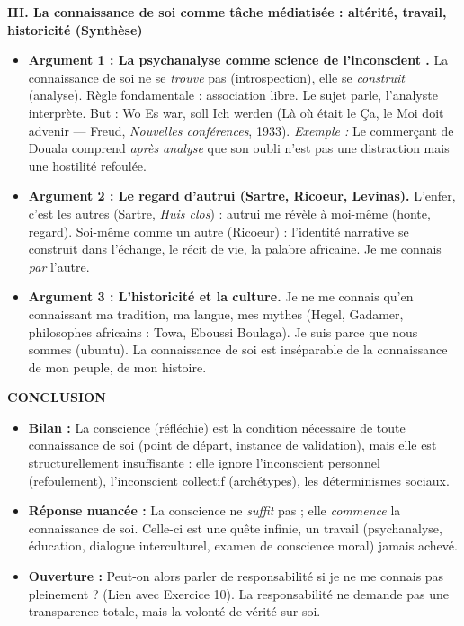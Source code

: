 \documentclass[11pt]{article}
\newcommand{\cle}[1]{{\popxbold\color{popdark}#1}}
\begin{document}
\begin{corrige}
\textbf{III. La connaissance de soi comme tâche médiatisée : altérité, travail, historicité (Synthèse)}
\begin{itemize}
\item \textbf{Argument 1 : La psychanalyse comme \guillemotleft science de l'inconscient \guillemotright.} La connaissance de soi ne se \emph{trouve} pas (introspection), elle se \emph{construit} (analyse). Règle fondamentale : \cle{association libre}. Le sujet parle, l'analyste interprète. But : \guillemotleft Wo Es war, soll Ich werden \guillemotright (Là où était le Ça, le Moi doit advenir — Freud, \emph{Nouvelles conférences}, 1933). \textit{Exemple :} Le commerçant de Douala comprend \emph{après analyse} que son oubli n'est pas une distraction mais une hostilité refoulée.
\item \textbf{Argument 2 : Le regard d'autrui (Sartre, Ricoeur, Levinas).} \guillemotleft L'enfer, c'est les autres \guillemotright (Sartre, \emph{Huis clos}) : autrui me révèle à moi-même (honte, regard). \guillemotleft Soi-même comme un autre \guillemotright (Ricoeur) : l'identité narrative se construit dans l'échange, le récit de vie, la \cle{palabre} africaine. Je me connais \emph{par} l'autre.
\item \textbf{Argument 3 : L'historicité et la culture.} Je ne me connais qu'en connaissant ma \cle{tradition}, ma \cle{langue}, mes \cle{mythes} (Hegel, Gadamer, philosophes africains : Towa, Eboussi Boulaga). \guillemotleft Je suis parce que nous sommes \guillemotright (ubuntu). La connaissance de soi est inséparable de la connaissance de mon peuple, de mon histoire.
\end{itemize}

\textbf{CONCLUSION}
\begin{itemize}
\item \textbf{Bilan :} La conscience (réfléchie) est la \cle{condition nécessaire} de toute connaissance de soi (point de départ, instance de validation), mais elle est \cle{structurellement insuffisante} : elle ignore l'inconscient personnel (refoulement), l'inconscient collectif (archétypes), les déterminismes sociaux.
\item \textbf{Réponse nuancée :} La conscience ne \emph{suffit} pas ; elle \emph{commence} la connaissance de soi. Celle-ci est une \cle{quête infinie}, un \cle{travail} (psychanalyse, éducation, dialogue interculturel, examen de conscience moral) jamais achevé.
\item \textbf{Ouverture :} Peut-on alors parler de \guillemotleft responsabilité \guillemotright si je ne me connais pas pleinement ? (Lien avec Exercice 10). La responsabilité ne demande pas une transparence totale, mais la \cle{volonté de vérité} sur soi.
\end{itemize}
\end{corrige}
\end{document}
